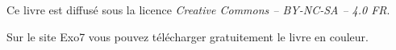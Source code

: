 \bigskip 

\begin{center}
\end{center}



\begin{center}
Ce livre est diffusé sous la licence \emph{Creative Commons -- BY-NC-SA -- 4.0 FR}.

Sur le site Exo7 vous pouvez télécharger gratuitement le livre en couleur.
\end{center}




\printindex
{}

